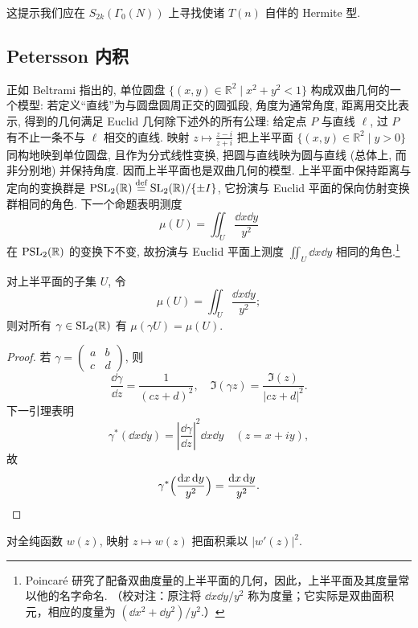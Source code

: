 这提示我们应在 $S_{2k}(\Gamma_0(N))$ 上寻找使诸 $T(n)$ 自伴的 Hermite 型.

\subsection*{Petersson 内积}

正如 Beltrami 指出的, 单位圆盘 $\{(x, y)\in\mathbb{R}^2 \mid x^2 + y^2 < 1\}$ 构成双曲几何的一个模型: 若定义``直线''为与圆盘圆周正交的圆弧段, 角度为通常角度, 距离用交比表示, 得到的几何满足 Euclid 几何除下述外的所有公理: 给定点 $P$ 与直线 $\ell$, 过 $P$ 有不止一条不与 $\ell$ 相交的直线. 映射 $z\mapsto\frac{z-i}{z+i}$ 把上半平面 $\{(x, y)\in\mathbb{R}^2 \mid y > 0\}$ 同构地映到单位圆盘, 且作为分式线性变换, 把圆与直线映为圆与直线 (总体上, 而非分别地) 并保持角度. 因而上半平面也是双曲几何的模型. 上半平面中保持距离与定向的变换群是 $\operatorname{PSL}_2(\mathbb{R}) \overset{\text{def}}{=} \operatorname{SL}_2(\mathbb{R})/\{\pm I\}$, 它扮演与 Euclid 平面的保向仿射变换群相同的角色. 下一个命题表明测度
\[
\mu(U) = \iint_U\frac{\dd x\dd y}{y^2}
\]
在 $\operatorname{PSL}_2(\mathbb{R})$ 的变换下不变, 故扮演与 Euclid 平面上测度 $\iint_U\dd x\dd y$ 相同的角色.\footnote{Poincar\'e 研究了配备双曲度量的上半平面的几何，因此，上半平面及其度量常以他的名字命名. （校对注：原注将 $\dd x\dd y/y^2$ 称为度量；它实际是双曲面积元，相应的度量为 $(\dd x^2+\dd y^2)/y^2$.）}

\begin{proposition} \label{thm:5.4.17}
对上半平面的子集 $U$, 令
\[
\mu(U) = \iint_U\frac{\dd x\dd y}{y^2};
\]
则对所有 $\gamma\in\operatorname{SL}_2(\mathbb{R})$ 有 $\mu(\gamma U) = \mu(U)$.
\end{proposition}

\begin{proof}
若 $\gamma = \begin{pmatrix}a & b\\ c & d\end{pmatrix}$, 则
\[
\frac{\dd \gamma}{\dd z} = \frac{1}{(cz+d)^2}, \quad \Im(\gamma z) = \frac{\Im(z)}{|cz+d|^2}.
\]
下一引理表明
\[
\gamma^*(\dd x\dd y) = \left|\frac{\dd \gamma}{\dd z}\right|^2\dd x\dd y \quad (z = x + iy),
\]
故
\[
\gamma^*\Bigl(\frac{\mathop{}\!\mathrm{d} x\mathop{}\!\mathrm{d} y}{y^2}\Bigr) = \frac{\mathop{}\!\mathrm{d} x\mathop{}\!\mathrm{d} y}{y^2}.
\]
\end{proof}

\begin{lemma} \label{thm:5.4.18}
对全纯函数 $w(z)$, 映射 $z\mapsto w(z)$ 把面积乘以 $|w'(z)|^2$.
\end{lemma}


